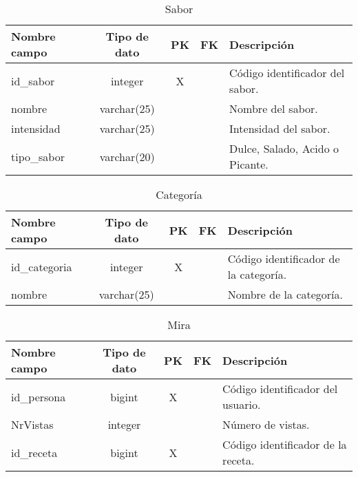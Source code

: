 \documentclass[12pt,a4paper]{article}
\begin{document}
\begin{table}[h!]
\centering
\begin{tabular}{|l|c|c|c|l|}
\hline
\textbf{Nombre campo}      & \textbf{Tipo de dato} & \textbf{PK} & \textbf{FK} & \textbf{Descripción} \\
\hline
id\_sabor                  & integer               & X           &             & Código identificador del sabor. \\
nombre                     & varchar(25)           &             &             & Nombre del sabor. \\
intensidad                 & varchar(25)           &             &             & Intensidad del sabor. \\
tipo\_sabor                & varchar(20)           &             &             & Dulce, Salado, Acido o Picante. \\
\hline
\end{tabular}
\caption{Sabor}
\label{table:sabor}
\end{table}

\begin{table}[h!]
\centering
\begin{tabular}{|l|c|c|c|l|}
\hline
\textbf{Nombre campo}      & \textbf{Tipo de dato} & \textbf{PK} & \textbf{FK} & \textbf{Descripción} \\
\hline
id\_categoria              & integer               & X           &             & Código identificador de la categoría. \\
nombre                     & varchar(25)           &             &             & Nombre de la categoría. \\
\hline
\end{tabular}
\caption{Categoría}
\label{table:categoria}
\end{table}

\begin{table}[h!]
\centering
\begin{tabular}{|l|c|c|c|l|}
\hline
\textbf{Nombre campo}      & \textbf{Tipo de dato} & \textbf{PK} & \textbf{FK} & \textbf{Descripción} \\
\hline
id\_persona                & bigint                & X           &             & Código identificador del usuario. \\
NrVistas                   & integer               &             &             & Número de vistas. \\
id\_receta                 & bigint                & X           &             & Código identificador de la receta. \\
\hline
\end{tabular}
\caption{Mira}
\label{table:mira}
\end{table}
\end{document}
